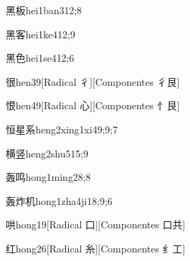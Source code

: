 \begin{verbete}{黑板}{hei1ban3}{12;8}
\end{verbete}

\begin{verbete}{黑客}{hei1ke4}{12;9}
\end{verbete}

\begin{verbete}{黑色}{hei1se4}{12;6}
\end{verbete}

\begin{verbete}{很}{hen3}{9}[Radical 彳][Componentes 彳艮]
\end{verbete}

\begin{verbete}{恨}{hen4}{9}[Radical 心][Componentes 忄艮]
\end{verbete}

\begin{verbete}{恒星系}{heng2xing1xi4}{9;9;7}
\end{verbete}

\begin{verbete}{横竖}{heng2shu5}{15;9}
\end{verbete}

\begin{verbete}{轰鸣}{hong1ming2}{8;8}
\end{verbete}

\begin{verbete}{轰炸机}{hong1zha4ji1}{8;9;6}
\end{verbete}

\begin{verbete}{哄}{hong1}{9}[Radical 口][Componentes 口共]
\end{verbete}

\begin{verbete}{红}{hong2}{6}[Radical 糸][Componentes ⺰工]
\end{verbete}


